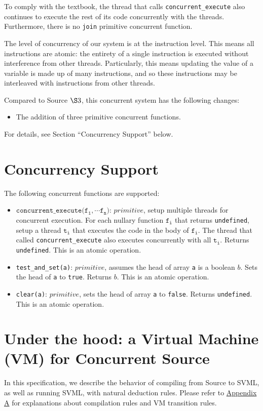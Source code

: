 To comply with the textbook, the thread that calls \texttt{concurrent\_execute} also continues to execute the rest of its code concurrently with the threads. Furthermore, there is no \texttt{join} primitive concurrent function.

The level of concurrency of our system is at the instruction level. This means all instructions are atomic: the entirety of a single instruction is executed without interference from other threads. Particularly, this means updating the value of a variable is made up of many instructions, and so these instructions may be interleaved with instructions from other threads.

Compared to Source \(\S 3\), this concurrent system has the following changes:
\begin{itemize}
\item The addition of three primitive concurrent functions.
\end{itemize}
For details, see Section ``Concurrency Support'' below.

\section{Concurrency Support}
\label{sec:orge505f00}
The following concurrent functions are supported:
\begin{itemize}
\item \(\texttt{concurrent_execute(}\texttt{f}_\texttt{1}, \cdots \texttt{f}_\texttt{n}\texttt{)}\): \(\textit{primitive}\), setup multiple threads for concurrent execution. For each nullary function \(\texttt{f}_\texttt{i}\) that returns \texttt{undefined}, setup a thread \(\texttt{t}_\texttt{i}\) that executes the code in the body of \(\texttt{f}_\texttt{i}\). The thread that called \texttt{concurrent\_execute} also executes concurrently with all \(\texttt{t}_\texttt{i}\). Returns \texttt{undefined}. This is an atomic operation.
\item \texttt{test\_and\_set(a)}: \(\textit{primitive}\), assumes the head of array \texttt{a} is a boolean \(b\). Sets the head of \texttt{a} to \texttt{true}. Returns \(b\). This is an atomic operation.
\item \texttt{clear(a)}: \(\textit{primitive}\), sets the head of array \texttt{a} to \texttt{false}. Returns \texttt{undefined}. This is an atomic operation.
\end{itemize}

\section{Under the hood: a Virtual Machine (VM) for Concurrent Source}
\label{sec:org1d2bc50}
In this specification, we describe the behavior of compiling from Source to SVML, as well as running SVML, with natural deduction rules. Please refer to \hyperref[sec:orgd804cd9]{Appendix A} for explanations about compilation rules and VM transition rules.

